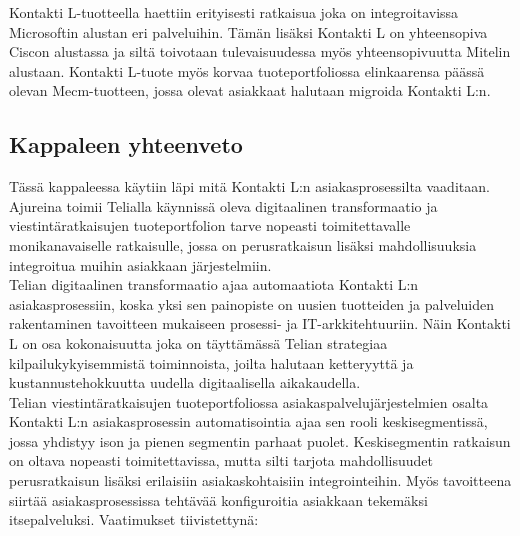 \documentclass[finnish,12pt,a4paper,pdftex]{article}
\begin{document}
\noindent Kontakti L-tuotteella haettiin erityisesti ratkaisua joka on integroitavissa Microsoftin alustan eri palveluihin. Tämän lisäksi Kontakti L on yhteensopiva Ciscon alustassa ja siltä toivotaan tulevaisuudessa myös yhteensopivuutta Mitelin alustaan. Kontakti L-tuote myös korvaa tuoteportfoliossa elinkaarensa päässä olevan Mecm-tuotteen, jossa olevat asiakkaat halutaan migroida Kontakti L:n. \\

\subsection{Kappaleen yhteenveto}

Tässä kappaleessa käytiin läpi mitä Kontakti L:n asiakasprosessilta vaaditaan. Ajureina toimii Telialla käynnissä oleva digitaalinen transformaatio ja viestintäratkaisujen tuoteportfolion tarve nopeasti toimitettavalle monikanavaiselle ratkaisulle, jossa on perusratkaisun lisäksi mahdollisuuksia integroitua muihin asiakkaan järjestelmiin.\\

\noindent Telian digitaalinen transformaatio ajaa automaatiota Kontakti L:n asiakasprosessiin, koska yksi sen painopiste on uusien tuotteiden ja palveluiden rakentaminen tavoitteen mukaiseen prosessi- ja IT-arkkitehtuuriin. Näin Kontakti L on osa kokonaisuutta joka on täyttämässä Telian strategiaa kilpailukykyisemmistä toiminnoista, joilta halutaan ketteryyttä ja kustannustehokkuutta uudella digitaalisella aikakaudella.\\

\noindent Telian viestintäratkaisujen tuoteportfoliossa asiakaspalvelujärjestelmien osalta Kontakti L:n asiakasprosessin automatisointia ajaa sen rooli keskisegmentissä, jossa yhdistyy ison ja pienen segmentin parhaat puolet. Keskisegmentin ratkaisun on oltava nopeasti toimitettavissa, mutta silti tarjota mahdollisuudet perusratkaisun lisäksi erilaisiin asiakaskohtaisiin integrointeihin. Myös tavoitteena siirtää asiakasprosessissa tehtävää konfiguroitia asiakkaan tekemäksi itsepalveluksi. Vaatimukset tiivistettynä:\\
\end{document}
